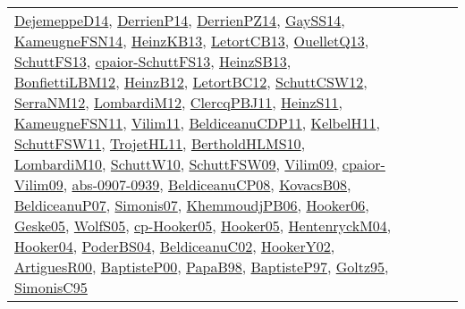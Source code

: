 {\begin{longtable}{lp{3cm}>{\raggedright}p{6cm}>{\raggedright}p{6cm}p{8cm}}
\href{papers/DejemeppeD14.pdf}{DejemeppeD14}\cite{DejemeppeD14}, \href{papers/DerrienP14.pdf}{DerrienP14}\cite{DerrienP14}, \href{papers/DerrienPZ14.pdf}{DerrienPZ14}\cite{DerrienPZ14}, \href{papers/GaySS14.pdf}{GaySS14}\cite{GaySS14}, \href{articles/KameugneFSN14.pdf}{KameugneFSN14}\cite{KameugneFSN14}, \href{papers/HeinzKB13.pdf}{HeinzKB13}\cite{HeinzKB13}, \href{papers/LetortCB13.pdf}{LetortCB13}\cite{LetortCB13}, \href{papers/OuelletQ13.pdf}{OuelletQ13}\cite{OuelletQ13}, \href{papers/SchuttFS13.pdf}{SchuttFS13}\cite{SchuttFS13}, \href{papers/cpaior-SchuttFS13.pdf}{cpaior-SchuttFS13}\cite{cpaior-SchuttFS13}, \href{articles/HeinzSB13.pdf}{HeinzSB13}\cite{HeinzSB13}, \href{papers/BonfiettiLBM12.pdf}{BonfiettiLBM12}\cite{BonfiettiLBM12}, \href{papers/HeinzB12.pdf}{HeinzB12}\cite{HeinzB12}, \href{papers/LetortBC12.pdf}{LetortBC12}\cite{LetortBC12}, \href{papers/SchuttCSW12.pdf}{SchuttCSW12}\cite{SchuttCSW12}, \href{papers/SerraNM12.pdf}{SerraNM12}\cite{SerraNM12}, \href{articles/LombardiM12.pdf}{LombardiM12}\cite{LombardiM12}, \href{papers/ClercqPBJ11.pdf}{ClercqPBJ11}\cite{ClercqPBJ11}, \href{papers/HeinzS11.pdf}{HeinzS11}\cite{HeinzS11}, \href{papers/KameugneFSN11.pdf}{KameugneFSN11}\cite{KameugneFSN11}, \href{papers/Vilim11.pdf}{Vilim11}\cite{Vilim11}, \href{articles/BeldiceanuCDP11.pdf}{BeldiceanuCDP11}\cite{BeldiceanuCDP11}, \href{articles/KelbelH11.pdf}{KelbelH11}\cite{KelbelH11}, \href{articles/SchuttFSW11.pdf}{SchuttFSW11}\cite{SchuttFSW11}, \href{articles/TrojetHL11.pdf}{TrojetHL11}\cite{TrojetHL11}, \href{papers/BertholdHLMS10.pdf}{BertholdHLMS10}\cite{BertholdHLMS10}, \href{papers/LombardiM10.pdf}{LombardiM10}\cite{LombardiM10}, \href{papers/SchuttW10.pdf}{SchuttW10}\cite{SchuttW10}, \href{papers/SchuttFSW09.pdf}{SchuttFSW09}\cite{SchuttFSW09}, \href{papers/Vilim09.pdf}{Vilim09}\cite{Vilim09}, \href{papers/cpaior-Vilim09.pdf}{cpaior-Vilim09}\cite{cpaior-Vilim09}, \href{articles/abs-0907-0939.pdf}{abs-0907-0939}\cite{abs-0907-0939}, \href{papers/BeldiceanuCP08.pdf}{BeldiceanuCP08}\cite{BeldiceanuCP08}, \href{articles/KovacsB08.pdf}{KovacsB08}\cite{KovacsB08}, \href{papers/BeldiceanuP07.pdf}{BeldiceanuP07}\cite{BeldiceanuP07}, \href{articles/Simonis07.pdf}{Simonis07}\cite{Simonis07}, \href{papers/KhemmoudjPB06.pdf}{KhemmoudjPB06}\cite{KhemmoudjPB06}, \href{articles/Hooker06.pdf}{Hooker06}\cite{Hooker06}, \href{papers/Geske05.pdf}{Geske05}\cite{Geske05}, \href{papers/WolfS05.pdf}{WolfS05}\cite{WolfS05}, \href{papers/cp-Hooker05.pdf}{cp-Hooker05}\cite{cp-Hooker05}, \href{articles/Hooker05.pdf}{Hooker05}\cite{Hooker05}, \href{papers/HentenryckM04.pdf}{HentenryckM04}\cite{HentenryckM04}, \href{papers/Hooker04.pdf}{Hooker04}\cite{Hooker04}, \href{articles/PoderBS04.pdf}{PoderBS04}\cite{PoderBS04}, \href{papers/BeldiceanuC02.pdf}{BeldiceanuC02}\cite{BeldiceanuC02}, \href{papers/HookerY02.pdf}{HookerY02}\cite{HookerY02}, \href{articles/ArtiguesR00.pdf}{ArtiguesR00}\cite{ArtiguesR00}, \href{articles/BaptisteP00.pdf}{BaptisteP00}\cite{BaptisteP00}, \href{articles/PapaB98.pdf}{PapaB98}\cite{PapaB98}, \href{papers/BaptisteP97.pdf}{BaptisteP97}\cite{BaptisteP97}, \href{papers/Goltz95.pdf}{Goltz95}\cite{Goltz95}, \href{papers/SimonisC95.pdf}{SimonisC95}\cite{SimonisC95} & 
\end{longtable}}
